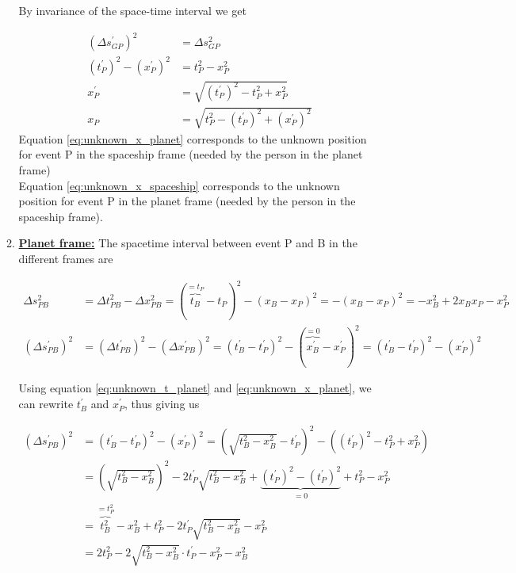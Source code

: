 \documentclass[a4paper,10pt,english]{article}
\begin{document}
\begin{enumerate}
\begin{enumerate}
By invariance of the space-time interval we get

\begin{align}
(\Delta s_{GP}^{\prime})^2&=\Delta s_{GP}^2 \nonumber\\
(t^{\prime}_{P})^{2}-(x^{\prime}_{P})^{2}&=t_{P}^{2}-x_{P}^{2} \nonumber\\
x^{\prime}_{P}&=\sqrt{(t^{\prime}_{P})^{2}-t_{P}^{2}+x_{P}^{2}} \label{eq:unknown_x_planet}\\
x_{P}&=\sqrt{t_{P}^{2}-(t^{\prime}_{P})^{2}+(x^{\prime}_{P})^{2}} \label{eq:unknown_x_spaceship}
\end{align}
Equation \ref{eq:unknown_x_planet} corresponds to the unknown position for event P in the spaceship frame (needed by the person in the planet frame)\\
Equation \ref{eq:unknown_x_spaceship} corresponds to the unknown position for event P in the planet frame (needed by the person in the spaceship frame).
\item \underline{\bf{Planet frame:}} The spacetime interval between event P and B in the different frames are

\begin{align*}
\Delta s_{PB}^2&=\Delta t_{PB}^2-\Delta x_{PB}^2=(\overbrace{t_{B}}^{=t_{P}}-t_{P})^2-(x_{B}-x_{P})^2=-(x_{B}-x_{P})^2=-x_{B}^2+2x_{B}x_{P}-x_{P}^2\\
(\Delta s_{PB}^{\prime})^2&=(\Delta t_{PB}^{\prime})^2-(\Delta x_{PB}^{\prime})^2=(t_{B}^{\prime}-t^{\prime}_{P})^2-(\overbrace{x_{B}^{\prime}}^{=0}-x^{\prime}_{P})^2=(t_{B}^{\prime}-t^{\prime}_{P})^2-(x^{\prime}_{P})^2
\end{align*}

Using equation \ref{eq:unknown_t_planet} and \ref{eq:unknown_x_planet}, we can rewrite $t^{\prime}_{B}$ and $x^{\prime}_{P}$, thus giving us 

\begin{align*}
(\Delta s_{PB}^{\prime})^2&=(t_{B}^{\prime}-t^{\prime}_{P})^2-(x^{\prime}_{P})^2=\left(\sqrt{t_{B}^2-x_{B}^2}-t^{\prime}_{P}\right)^2-\left((t^{\prime}_{P})^{2}-t_{P}^{2}+x_{P}^{2}\right)\\
&=\left(\sqrt{t_{B}^2-x_{B}^2}\right)^2-2t^{\prime}_{P}\sqrt{t_{B}^2-x_{B}^2}+\underbrace{(t^{\prime}_{P})^2-(t^{\prime}_{P})^{2}}_{=0}+t_{P}^{2}-x_{P}^{2}\\
&=\overbrace{t_{B}^2}^{=t_{P}^2}-x_{B}^2+t_{P}^{2}-2t^{\prime}_{P}\sqrt{t_{B}^2-x_{B}^2}-x_{P}^{2}\\
&=2t_{P}^{2}-2\sqrt{t_{B}^2-x_{B}^2}\cdot t^{\prime}_{P}-x_{P}^{2}-x_{B}^2
\end{align*}


\end{enumerate}
\end{enumerate}
\end{document}
